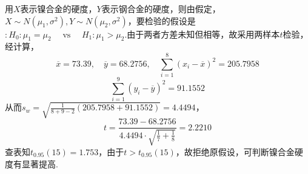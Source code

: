 \begin{solution}
	用$X$表示镍合金的硬度，$Y$表示钢合金的硬度，则由假定，$X\sim N(\mu_{ 1 },\sigma^{2}),Y\sim N(\mu_{ 2},\sigma^{ 2 })$，要检验的假设是$:H _ { 0 } : \mu _ { 1 } = \mu _ { 2 } \quad \text { vs } \quad H _ { 1 } : \mu _ { 1 } > \mu _ { 2 }$.由于两者方差未知但相等，故采用两样本$t$检验，经计算，
	\[\overline { x } = 73.39 , \quad \overline { y } = 68.2756 , \quad \sum _ { i = 1 } ^ { 8 } \left( x _ { i } - \overline { x } \right) ^ { 2 } = 205.7958\]
	\[\sum _ { i = 1 } ^ { 9 } \left( y _ { i } - \overline { y } \right) ^ { 2 } = 91.1552\]
	从而$s _ { w } = \sqrt { \frac { 1 } { 8 + 9 - 2 } ( 205.7958 + 91.1552 ) } = 4.4494$，
	\[t = \frac { 73.39 - 68.2756 } { 4.4494 \cdot \sqrt { \frac { 1 } { 7 } + \frac { 1 } { 8 } } } = 2.2210\]
	查表知$t _ { 0.95 } ( 15 ) = 1.753$，由于$t>t_{0.95}(15)$，故拒绝原假设，可判断镍合金硬度有显著提高.
	

\end{solution}
